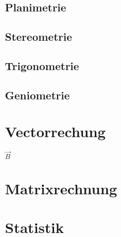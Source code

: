 \documentclass[8pt,a4paper,fleqn]{article}
\begin{document}
\subsection{Planimetrie}
\subsection{Stereometrie}
\subsection{Trigonometrie}
\subsection{Geniometrie}
\section{Vectorrechung}
$\vec{B}$
\section{Matrixrechnung}
\section{Statistik}
\end{document}
